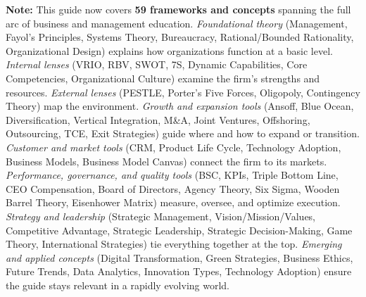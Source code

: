 \documentclass[11pt, letterpaper]{article}
\begin{document}
\vspace{1.5em}
\begin{defbox}
\textbf{Note:} This guide now covers \textbf{59 frameworks and concepts} spanning the full arc of business and management education. \textit{Foundational theory} (Management, Fayol's Principles, Systems Theory, Bureaucracy, Rational/Bounded Rationality, Organizational Design) explains how organizations function at a basic level. \textit{Internal lenses} (VRIO, RBV, SWOT, 7S, Dynamic Capabilities, Core Competencies, Organizational Culture) examine the firm's strengths and resources. \textit{External lenses} (PESTLE, Porter's Five Forces, Oligopoly, Contingency Theory) map the environment. \textit{Growth and expansion tools} (Ansoff, Blue Ocean, Diversification, Vertical Integration, M\&A, Joint Ventures, Offshoring, Outsourcing, TCE, Exit Strategies) guide where and how to expand or transition. \textit{Customer and market tools} (CRM, Product Life Cycle, Technology Adoption, Business Models, Business Model Canvas) connect the firm to its markets. \textit{Performance, governance, and quality tools} (BSC, KPIs, Triple Bottom Line, CEO Compensation, Board of Directors, Agency Theory, Six Sigma, Wooden Barrel Theory, Eisenhower Matrix) measure, oversee, and optimize execution. \textit{Strategy and leadership} (Strategic Management, Vision/Mission/Values, Competitive Advantage, Strategic Leadership, Strategic Decision-Making, Game Theory, International Strategies) tie everything together at the top. \textit{Emerging and applied concepts} (Digital Transformation, Green Strategies, Business Ethics, Future Trends, Data Analytics, Innovation Types, Technology Adoption) ensure the guide stays relevant in a rapidly evolving world.
\end{defbox}
\end{document}
